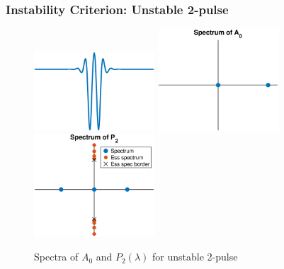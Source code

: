 \documentclass[16pt]{beamer}
\begin{document}
\begin{frame}
\frametitle{Instability Criterion: Unstable 2-pulse}
\begin{figure}
\begin{center}
\includegraphics[width=4.5cm]{images/unstable1.eps}
\includegraphics[width=4.5cm]{images/unstable1A0.eps}
\includegraphics[width=4.5cm]{images/unstable1spec.eps}
\caption{Spectra of $A_0$ and $P_2(\lambda)$ for unstable 2-pulse}
\end{center}
\end{figure}
\end{frame}
\end{document}
